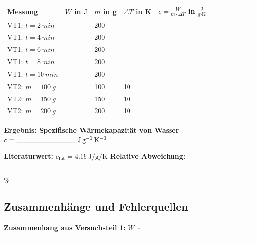 \documentclass[11pt,a4paper]{scrartcl}
\begin{document}
	\begin{center}
		\renewcommand{\arraystretch}{2.5}
		\begin{tabular}{|p{3cm}|p{2cm}|p{2cm}|p{2cm}|p{2.5cm}|}
			\hline
			\textbf{Messung} & $W$ in J & $m$ in g & $\Delta T$ in K & $c = \frac{W}{m \cdot \Delta T}$ in $\frac{\text{J}}{\text{g}\cdot\text{K}}$ \\
			\hline
			VT1: $t = \SI{2}{min}$ & & 200 & & \\
			\hline
			VT1: $t = \SI{4}{min}$ & & 200 & & \\
			\hline
			VT1: $t = \SI{6}{min}$ & & 200 & & \\
			\hline
			VT1: $t = \SI{8}{min}$ & & 200 & & \\
			\hline
			VT1: $t = \SI{10}{min}$ & & 200 & & \\
			\hline
			VT2: $m = \SI{100}{g}$ & & 100 & 10 & \\
			\hline
			VT2: $m = \SI{150}{g}$ & & 150 & 10 & \\
			\hline
			VT2: $m = \SI{200}{g}$ & & 200 & 10 & \\
			\hline
		\end{tabular}
	\end{center}
	
	\vspace{0.5cm}
	
	\begin{tcolorbox}[colback=yellow!10!white, colframe=yellow!50!black, width=\textwidth]
		\centering
		\textbf{Ergebnis: Spezifische Wärmekapazität von Wasser}\\[0.3cm]
		{\Large $\bar{c} = \rule{3cm}{0.4pt}\;\si{\joule\per\gram\per\kelvin}$}
	\end{tcolorbox}
	
	\vspace{0.3cm}
	
	\textbf{Literaturwert:} $c_{\text{Lit}} = \SI{4,19}{\joule\per\gram\per\kelvin}$ \hfill \textbf{Relative Abweichung:} \rule{3cm}{0.4pt} \%
	
	\vspace{0.5cm}
	
	\subsection*{Zusammenhänge und Fehlerquellen}
	
	\textbf{Zusammenhang aus Versuchsteil 1:} $W \sim$ \rule{3cm}{0.4pt}
	
	\vspace{0.5cm}
	
\end{document}
